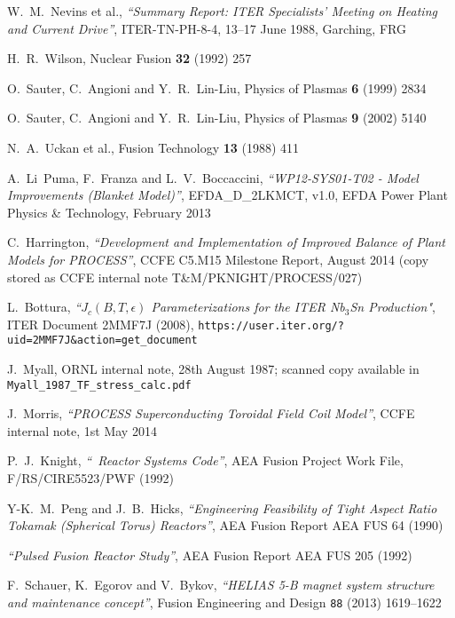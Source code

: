 \begin{thebibliography}{99}
W.\ M.\ Nevins et al.,
\textit{``Summary Report: ITER Specialists' Meeting on Heating and
Current Drive''},
ITER-TN-PH-8-4,
13--17 June 1988, Garching, FRG

H.\ R.\ Wilson,
Nuclear Fusion \textbf{32} (1992) 257

O.\ Sauter, C.\ Angioni and Y.\ R.\ Lin-Liu,
Physics of Plasmas \textbf{6} (1999) 2834

O.\ Sauter, C.\ Angioni and Y.\ R.\ Lin-Liu,
Physics of Plasmas \textbf{9} (2002) 5140

N.\ A.\ Uckan et al.,
Fusion Technology \textbf{13} (1988) 411

A.\ Li~Puma, F.\ Franza and L.\ V.\ Boccaccini, \textit{``WP12-SYS01-T02 -
  Model Improvements (Blanket Model)''},
EFDA\_D\_2LKMCT, v1.0, EFDA Power Plant Physics \& Technology, February 2013

C.\ Harrington,
\textit{``Development and Implementation of Improved
  Balance of Plant Models for PROCESS''},
CCFE C5.M15 Milestone Report, August 2014 (copy stored as CCFE internal note
T\&M/PKNIGHT/PROCESS/027)

L.\ Bottura,
\textit{``$J_c(B,T,\epsilon)$ Parameterizations for the ITER Nb$_3$Sn
  Production"},
ITER Document 2MMF7J (2008),
\texttt{https://user.iter.org/?uid=2MMF7J\&action=get\_document}

J.\ Myall,
ORNL internal note, 28th August 1987; scanned copy available in
\texttt{Myall\_1987\_TF\_stress\_calc.pdf}

J.\ Morris,
\textit{``PROCESS Superconducting Toroidal Field Coil Model''},
CCFE internal note, 1st May 2014

P.\ J.\ Knight,
\textit{``\process\ Reactor Systems Code''},
AEA Fusion Project Work File, F/RS/CIRE5523/PWF
(1992)

Y-K.\ M.\ Peng and J.\ B.\ Hicks,
\textit{``Engineering Feasibility of Tight Aspect Ratio Tokamak
(Spherical Torus) Reactors''},
AEA Fusion Report AEA FUS 64 (1990)

\textit{``Pulsed Fusion Reactor Study''},
AEA Fusion Report AEA FUS 205
(1992)

F.\ Schauer, K.\ Egorov and V.\ Bykov,
\textit{``HELIAS 5-B magnet system structure and maintenance concept''},
Fusion Engineering and Design \texttt{88} (2013) 1619--1622


\end{thebibliography}

